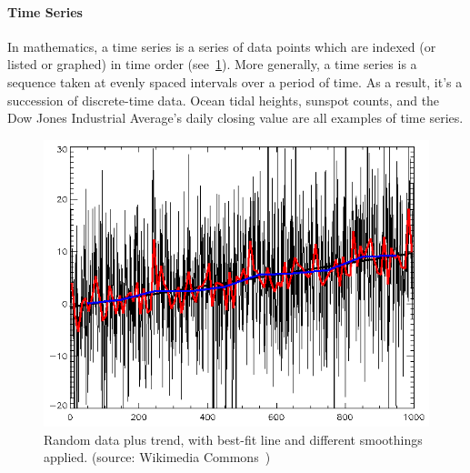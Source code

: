 \paragraph{Time Series} In mathematics, a time series is a series of data points which are indexed (or listed or graphed) in time order (see~\ref{fig:random time-series}). More generally, a time series is a sequence taken at evenly spaced intervals over a period of time. As a result, it's a succession of discrete-time data. Ocean tidal heights, sunspot counts, and the Dow Jones Industrial Average's daily closing value are all examples of time series.
\begin{figure}[ht]
    \centering
    \includegraphics[width=\linewidth]{content/chapter_3/images/random-data-plus-trend-r2.png}
    \caption{Random data plus trend, with best-fit line and different smoothings applied. (source: Wikimedia Commons~\cite{file:random-data-plus-trend-r2})}
    \label{fig:random time-series}
\end{figure}
